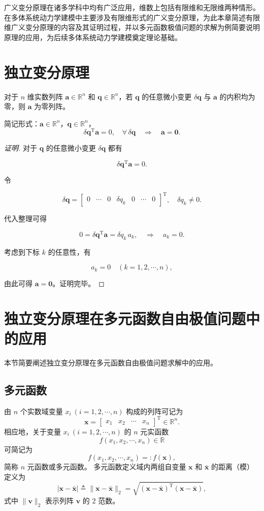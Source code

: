 广义变分原理在诸多学科中均有广泛应用，维数上包括有限维和无限维两种情形。在多体系统动力学建模中主要涉及有限维形式的广义变分原理，为此本章简述有限维广义变分原理的内容及其证明过程，并以多元函数极值问题的求解为例简要说明原理的应用，为后续多体系统动力学建模奠定理论基础。
\section{独立变分原理}
\begin{theorem}[独立变分原理]
对于 $n$ 维实数列阵 $\boldsymbol{a}\in\mathbb{R}^n$ 和 $\boldsymbol{q}\in\mathbb{R}^n$，若 $\boldsymbol{q}$ 的任意微小变更 $\delta\boldsymbol{q}$ 与 $\boldsymbol{a}$ 的内积均为零，则 $\boldsymbol{a}$ 为零列阵。
\end{theorem}
简记形式：$\boldsymbol{a}\in\mathbb{R}^n$，$\boldsymbol{q}\in\mathbb{R}^n$，
\[
\delta\boldsymbol{q}^{\mathrm{T}}\boldsymbol{a}=0,\quad\forall\,\delta\boldsymbol{q}\quad\Rightarrow\quad\boldsymbol{a}=\boldsymbol{0}.
\]
\begin{proof}[证明]
对于 $\boldsymbol{q}$ 的任意微小变更 $\delta\boldsymbol{q}$ 都有

\[
\delta\boldsymbol{q}^{\mathrm{T}}\boldsymbol{a}=0.
\]

令

\[
\delta\boldsymbol{q}=\begin{bmatrix}0&\cdots&0&\delta q_k&0&\cdots&0\end{bmatrix}^{\mathrm{T}},\quad\delta q_k\neq0.
\]

代入整理可得

\[
0=\delta\boldsymbol{q}^{\mathrm{T}}\boldsymbol{a}=\delta q_k\,a_k,\quad\Rightarrow\quad a_k=0.
\]

考虑到下标 $k$ 的任意性，有

\[
a_k=0\quad(k=1,2,\cdots,n),
\]

由此可得 $\boldsymbol{a}=\boldsymbol{0}$。证明完毕。
\end{proof}
\section{独立变分原理在多元函数自由极值问题中的应用}
本节简要阐述独立变分原理在多元函数自由极值问题求解中的应用。
\subsection{多元函数}
由 $n$ 个实数域变量 $x_i\ (i=1,2,\cdots,n)$ 构成的列阵可记为
\[
\boldsymbol{x}=\begin{bmatrix}x_1&x_2&\cdots&x_n\end{bmatrix}^{\mathrm{T}}\in\mathbb{R}^n.
\]
相应地，关于变量 $x_i\ (i=1,2,\cdots,n)$ 的 $n$ 元实函数
\[
f(x_1,x_2,\cdots,x_n)\in\mathbb{R}
\]
可简记为
\[
f(x_1,x_2,\cdots,x_n)=:f(\boldsymbol{x}),
\]
简称 $n$ 元函数或多元函数。
多元函数定义域内两组自变量 $\boldsymbol{x}$ 和 $\bar{\boldsymbol{x}}$ 的距离（模）定义为
\[
|\boldsymbol{x}-\bar{\boldsymbol{x}}|\triangleq\|\boldsymbol{x}-\bar{\boldsymbol{x}}\|_2=\sqrt{(\boldsymbol{x}-\bar{\boldsymbol{x}})^{\mathrm{T}}(\boldsymbol{x}-\bar{\boldsymbol{x}})},
\]
式中 $\|\boldsymbol{v}\|_2$ 表示列阵 $\boldsymbol{v}$ 的 2 范数。

